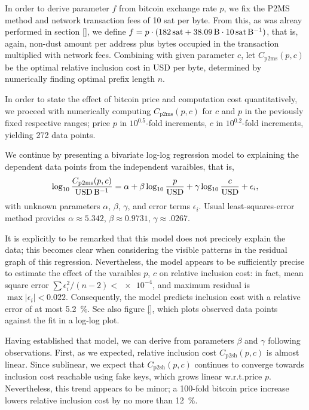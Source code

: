 \documentclass[10pt,a4paper,twocolumn]{article}
\begin{document}
In order to derive parameter $f$ from bitcoin exchange rate $p$, we fix the P2MS method and network transaction fees of 10 sat per byte.
From this, as was alreay performed in section \ref{}, we define $f = p \cdot (182\,\text{sat} + \SI{38.09}{\byte}\cdot 10\,\text{sat}\,\si{\per\byte})$, that is, again, non-dust amount per address plus bytes occupied in the transaction multiplied with network fees.
Combining with given parameter $c$, let $C_\text{p2ms}(p,c)$ be the optimal relative inclusion cost in USD per byte, determined by numerically finding optimal prefix length $n$.

In order to state the effect of bitcoin price and computation cost quantitatively, we proceed with numerically computing $C_\text{p2ms}(p,c)$ for $c$ and $p$ in the peviously fixed respective ranges; price $p$ in $10^{0.5}$-fold increments, $c$ in $10^{0.2}$-fold increments, yielding 272 data points.

We continue by presenting a bivariate log-log regression model to explaining the dependent data points from the independent varaibles, that is,
\[ \log_{10} \frac{C_\text{p2ms}(p, c)}{\text{USD}\,\si{\per\byte}} = \alpha + \beta \log_{10} \frac{p}{\text{USD}} + \gamma \log_{10} \frac{c}{\text{USD}} + \epsilon_i, \]
with unknown parameters $\alpha$, $\beta$, $\gamma$, and error terms $\epsilon_i$.
Usual least-squares-error method provides $\alpha \approx \num{5.342}$, $\beta \approx\num{0.9731}$, $\gamma \approx\num{.0267}$.

It is explicitly to be remarked that this model does not precicely explain the data; this becomes clear when considering the visible patterns in the residual graph of this regression.
Nevertheless, the model appears to be sufficiently precise to estimate the effect of the varaibles $p$, $c$ on relative inclusion cost: in fact, mean square error $\sum \epsilon_i^2/(n-2) < \num{e-4}$, and maximum residual is $\max |\epsilon_i| < 0.022$. Consequently, the model predicts inclusion cost with a relative error of at most \SI{5.2}{\percent}.
See also figure \ref{}, which plots observed data points against the fit in a log-log plot.

Having established that model, we can derive from parameters $\beta$ and $\gamma$ following observations.
First, as we expected, relative inclusion cost $C_\mathrm{p2sh}(p,c)$ is almost linear.
Since sublinear, we expect that $C_\mathrm{p2sh}(p,c)$ continues to converge towards inclusion cost reachable using fake keys, which grows linear w.r.t.\@ price $p$.
Nevertheless, this trend appears to be minor; a 100-fold bitcoin price increase lowers relative inclusion cost by no more than \SI{12}{\percent}.
\end{document}
